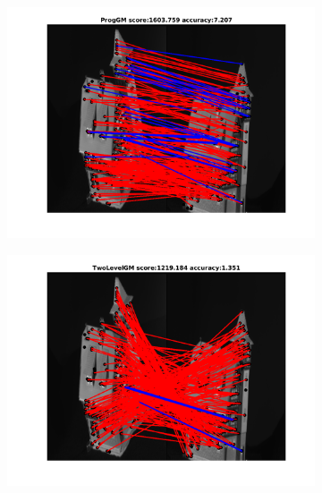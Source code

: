\documentclass[
	fontsize=12pt,
	paper=a4,
	twoside=false,
	numbers=noenddot,
	plainheadsepline,
	toc=listof,
	toc=bibliography
]{scrartcl}
\begin{document}
\begin{figure}[h!] 
	\begin{subfigure}[b]{0.3\textwidth}
		\centering
		\includegraphics[scale=0.25]{"fig_ver2608/RealImages/HouseSeq/no_descr/using_cpd_afftrafo/solution/fi_11_ProgGM"}  
	\end{subfigure}%
	\begin{subfigure}[b]{0.3\textwidth}
		\centering
		\includegraphics[scale=0.25]{"fig_ver2608/RealImages/HouseSeq/no_descr/using_cpd_afftrafo/solution/fi_11_TwoLevelGM"}  
	\end{subfigure} 
	\begin{subfigure}[b]{0.3\textwidth}
		\centering

\end{subfigure}
\end{figure}
\end{document}
